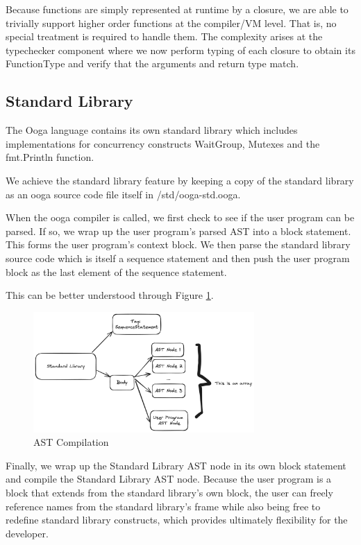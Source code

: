 \documentclass{report}
\begin{document}
Because functions are simply represented at runtime by a closure, we are able to trivially support higher order functions at the compiler/VM level. That is, no special treatment is required to handle them. The complexity arises at the typechecker component where we now perform typing of each closure to obtain its FunctionType and verify that the arguments and return type match.

\subsection{Standard Library}

The Ooga language contains its own standard library which includes implementations for concurrency constructs WaitGroup, Mutexes and the fmt.Println function.

We achieve the standard library feature by keeping a copy of the standard library as an ooga source code file itself in /std/ooga-std.ooga.

When the ooga compiler is called, we first check to see if the user program can be parsed. If so, we wrap up the user program's parsed AST into a block statement. This forms the user program's context block. We then parse the standard library source code which is itself a sequence statement and then push the user program block as the last element of the sequence statement.

This can be better understood through Figure \ref{fig:ast-compilation}.

\begin{figure}
    \centering
    \includegraphics[width=0.75\textwidth]{images/AST-compilation.png}
    \caption{AST Compilation}
    \label{fig:ast-compilation}
\end{figure}

Finally, we wrap up the Standard Library AST node in its own block statement and compile the Standard Library AST node. Because the user program is a block that extends from the standard library's own block, the user can freely reference names from the standard library's frame while also being free to redefine standard library constructs, which provides ultimately flexibility for the developer.
\end{document}

